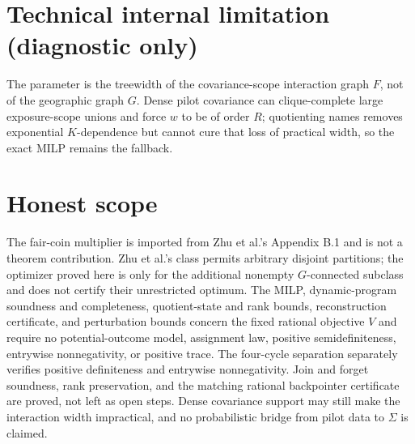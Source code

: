 \documentclass{article}
\begin{document}
\section*{Technical internal limitation (diagnostic only)}

The parameter is the treewidth of the covariance-scope interaction graph \(F\), not of the geographic graph \(G\).  Dense pilot covariance can clique-complete large exposure-scope unions and force \(w\) to be of order \(R\); quotienting names removes exponential \(K\)-dependence but cannot cure that loss of practical width, so the exact MILP remains the fallback.

\section{Honest scope}

The fair-coin multiplier is imported from Zhu et al.'s Appendix B.1 and is not a theorem contribution.  Zhu et al.'s class permits arbitrary disjoint partitions; the optimizer proved here is only for the additional nonempty \(G\)-connected subclass and does not certify their unrestricted optimum.  The MILP, dynamic-program soundness and completeness, quotient-state and rank bounds, reconstruction certificate, and perturbation bounds concern the fixed rational objective \(V\) and require no potential-outcome model, assignment law, positive semidefiniteness, entrywise nonnegativity, or positive trace.  The four-cycle separation separately verifies positive definiteness and entrywise nonnegativity.  Join and forget soundness, rank preservation, and the matching rational backpointer certificate are proved, not left as open steps.  Dense covariance support may still make the interaction width impractical, and no probabilistic bridge from pilot data to \(\Sigma\) is claimed.
\end{document}
